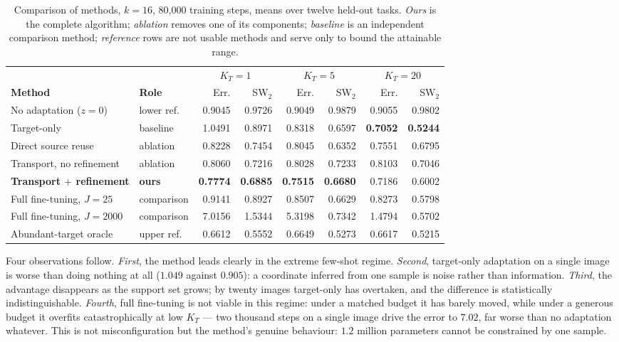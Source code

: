 \documentclass[11pt]{article}
\begin{document}
\begin{table}[htbp]
\centering\footnotesize
\begin{tabular}{@{}llrrrrrr@{}}
\toprule
 & & \multicolumn{2}{c}{$K_T=1$} & \multicolumn{2}{c}{$K_T=5$} & \multicolumn{2}{c}{$K_T=20$} \\
\cmidrule(lr){3-4}\cmidrule(lr){5-6}\cmidrule(lr){7-8}
\textbf{Method} & \textbf{Role} & Err. & SW$_2$ & Err. & SW$_2$ & Err. & SW$_2$ \\
\midrule
No adaptation ($z=0$)      & lower ref.        & 0.9045 & 0.9726 & 0.9049 & 0.9879 & 0.9055 & 0.9802 \\
Target-only                & baseline          & 1.0491 & 0.8971 & 0.8318 & 0.6597 & \textbf{0.7052} & \textbf{0.5244} \\
Direct source reuse        & ablation          & 0.8228 & 0.7454 & 0.8045 & 0.6352 & 0.7551 & 0.6795 \\
Transport, no refinement   & ablation          & 0.8060 & 0.7216 & 0.8028 & 0.7233 & 0.8103 & 0.7046 \\
\textbf{Transport $+$ refinement} & \textbf{ours} & \textbf{0.7774} & \textbf{0.6885} & \textbf{0.7515} & \textbf{0.6680} & 0.7186 & 0.6002 \\
Full fine-tuning, $J=25$   & comparison        & 0.9141 & 0.8927 & 0.8507 & 0.6629 & 0.8273 & 0.5798 \\
Full fine-tuning, $J=2000$ & comparison        & 7.0156 & 1.5344 & 5.3198 & 0.7342 & 1.4794 & 0.5702 \\
Abundant-target oracle     & upper ref.        & 0.6612 & 0.5552 & 0.6649 & 0.5273 & 0.6617 & 0.5215 \\
\bottomrule
\end{tabular}
\caption{Comparison of methods, $k=16$, 80{,}000 training steps, means over twelve held-out tasks.
\emph{Ours} is the complete algorithm; \emph{ablation} removes one of its components;
\emph{baseline} is an independent comparison method; \emph{reference} rows are not usable methods
and serve only to bound the attainable range.}
\label{tab:main}
\end{table}

Four observations follow. \emph{First}, the method leads clearly in the extreme few-shot regime.
\emph{Second}, target-only adaptation on a single image is worse than doing nothing at all
($1.049$ against $0.905$): a coordinate inferred from one sample is noise rather than information.
\emph{Third}, the advantage disappears as the support set grows; by twenty images target-only has
overtaken, and the difference is statistically indistinguishable. \emph{Fourth}, full fine-tuning is
not viable in this regime: under a matched budget it has barely moved, while under a generous budget
it overfits catastrophically at low $K_T$ --- two thousand steps on a single image drive the error to
$7.02$, far worse than no adaptation whatever. This is not misconfiguration but the method's genuine
behaviour: $1.2$ million parameters cannot be constrained by one sample.
\end{document}

